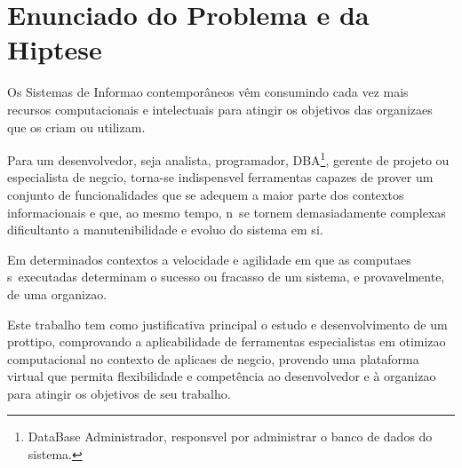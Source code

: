 \chapter{Enunciado do Problema e da Hip\oh tese}
\label{pro:enunciado}

Os Sistemas de Informa\ca o contempor\^aneos v\^em consumindo cada vez mais recursos computacionais e intelectuais para atingir os objetivos das organiza\co es que os criam ou utilizam.

Para um desenvolvedor, seja analista, programador, DBA\footnote{DataBase Administrador, respons\ah vel por administrar o banco de dados do sistema.}, gerente de projeto ou especialista de neg\oh cio, torna-se indispens\ah vel ferramentas capazes de prover um conjunto de funcionalidades que se adequem a maior parte dos contextos informacionais e que, ao mesmo tempo, n\ao\ se tornem demasiadamente complexas dificultanto a manutenibilidade e evolu\ca o do sistema em si.

Em determinados contextos a velocidade e agilidade em que as computa\co es s\ao\ executadas determinam o sucesso ou fracasso de um sistema, e provavelmente, de uma organiza\ca o.

Este trabalho tem como justificativa principal o estudo e desenvolvimento de um prot\oh tipo, comprovando a aplicabilidade de ferramentas especialistas em otimiza\ca o computacional no contexto de aplica\co es de neg\oh cio, provendo uma plataforma virtual que permita flexibilidade e compet\^encia ao desenvolvedor e \`a organiza\ca o para atingir os objetivos de seu trabalho.

